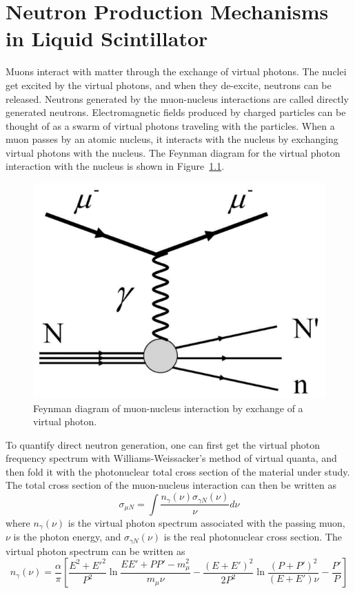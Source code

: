 \chapter{Neutron Production Mechanisms in Liquid Scintillator}\label{chap:yield_theory}

Muons interact with matter through the exchange of virtual photons. The nuclei get excited by the virtual photons, and when they de-excite, neutrons can be released. Neutrons generated by the muon-nucleus interactions are called directly generated neutrons. Electromagnetic fields produced by charged particles can be thought of as a swarm of virtual photons traveling with the particles. When a muon passes by an atomic nucleus, it interacts with the nucleus by exchanging virtual photons with the nucleus. The Feynman diagram for the virtual photon interaction with the nucleus is shown in Figure~\ref{fig:muon_spallation}.
\begin{figure}
	\centering
	\includegraphics[width=.5\textwidth]{figures/chap6/mu_N_Feynman_diagram.eps}
	\caption{Feynman diagram of muon-nucleus interaction by exchange of a virtual photon.}
	\label{fig:muon_spallation}
\end{figure}
To quantify direct neutron generation, one can first get the virtual photon frequency spectrum with Williams-Weissacker's method of virtual quanta, and then fold it with the photonuclear total cross section of the material under study. The total cross section of the muon-nucleus interaction can then be written as~\cite{Formaggio2004}~\cite{Luu2006}
\begin{equation}\label{eq:mu_N_cross_section}
	\sigma_{\mu N}=\int\frac{n_\gamma(\nu)\sigma_{\gamma N}(\nu)}{\nu}d\nu
\end{equation}
where $n_\gamma(\nu)$ is the virtual photon spectrum associated with the passing muon, $\nu$ is the photon energy, and $\sigma_{\gamma N}(\nu)$ is the real photonuclear cross section. The virtual photon spectrum can be written as~\cite{Delorme1995}
\begin{equation}
	n_\gamma(\nu)=\frac{\alpha}{\pi}\left[\frac{E^2+E'^2}{P^2}\ln\frac{EE'+PP'-m_\mu^2}{m_\mu\nu}-\frac{(E+E')^2}{2P^2}\ln\frac{(P+P')^2}{(E+E')\nu}-\frac{P'}{P}\right]
\end{equation}
